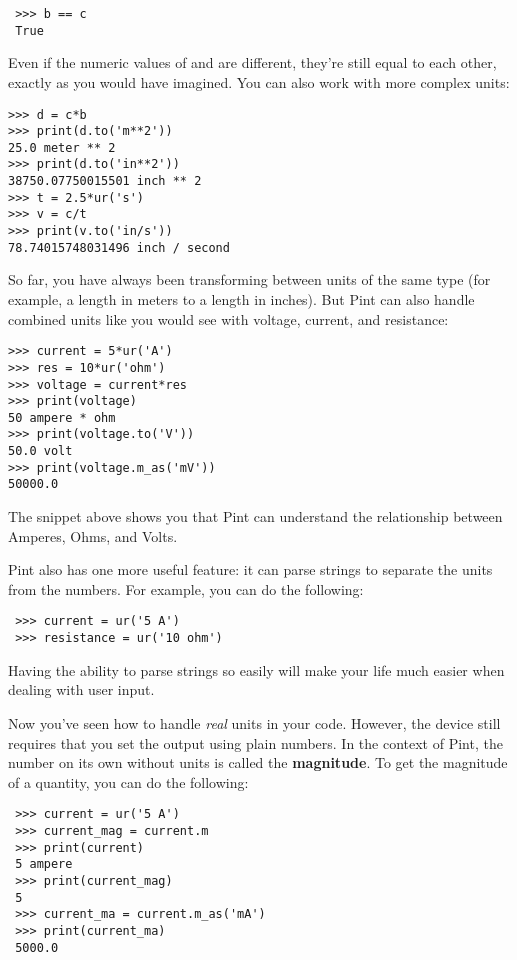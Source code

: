\begin{verbatim}
 >>> b == c
 True
\end{verbatim}

Even if the numeric values of  and  are different, they're still equal to each other, exactly as you would have imagined. You can also work with more complex units:

\begin{verbatim}
>>> d = c*b
>>> print(d.to('m**2'))
25.0 meter ** 2
>>> print(d.to('in**2'))
38750.07750015501 inch ** 2
>>> t = 2.5*ur('s')
>>> v = c/t
>>> print(v.to('in/s'))
78.74015748031496 inch / second
\end{verbatim}

So far, you have always been transforming between units of the same type (for example, a length in meters to a length in inches). But Pint can also handle combined units like you would see with voltage, current, and resistance:

\begin{verbatim}
>>> current = 5*ur('A')
>>> res = 10*ur('ohm')
>>> voltage = current*res
>>> print(voltage)
50 ampere * ohm
>>> print(voltage.to('V'))
50.0 volt
>>> print(voltage.m_as('mV'))
50000.0
\end{verbatim}

The snippet above shows you that Pint can understand the relationship between Amperes, Ohms, and Volts.

Pint also has one more useful feature: it can parse strings to separate the units from the numbers. For example, you can do the following:

\begin{verbatim}
 >>> current = ur('5 A')
 >>> resistance = ur('10 ohm')
\end{verbatim}

Having the ability to parse strings so easily will make your life much easier when dealing with user input.

Now you've seen how to handle \emph{real} units in your code. However, the device still requires that you set the output using plain numbers. In the context of Pint, the number on its own without units is called the \textbf{magnitude}. To get the magnitude of a quantity, you can do the following:

\begin{verbatim}
 >>> current = ur('5 A')
 >>> current_mag = current.m
 >>> print(current)
 5 ampere
 >>> print(current_mag)
 5
 >>> current_ma = current.m_as('mA')
 >>> print(current_ma)
 5000.0
\end{verbatim}

